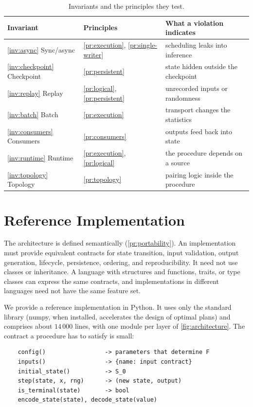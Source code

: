 \documentclass[11pt,a4paper]{article}
\theoremstyle{definition}
\theoremstyle{remark}
\begin{document}
\begin{table}[t]
\centering
\caption{Invariants and the principles they test.}
\label{tab:invariants}
\begin{tabular}{lll}
\toprule
\textbf{Invariant} & \textbf{Principles} & \textbf{What a violation indicates} \\
\midrule
\ref{inv:async} Sync/async & \ref{pr:execution}, \ref{pr:single-writer} & scheduling leaks into inference \\
\ref{inv:checkpoint} Checkpoint & \ref{pr:persistent} & state hidden outside the checkpoint \\
\ref{inv:replay} Replay & \ref{pr:logical}, \ref{pr:persistent} & unrecorded inputs or randomness \\
\ref{inv:batch} Batch & \ref{pr:execution} & transport changes the statistics \\
\ref{inv:consumers} Consumers & \ref{pr:consumers} & outputs feed back into state \\
\ref{inv:runtime} Runtime & \ref{pr:execution}, \ref{pr:logical} & the procedure depends on a source \\
\ref{inv:topology} Topology & \ref{pr:topology} & pairing logic inside the procedure \\
\bottomrule
\end{tabular}
\end{table}

\section{Reference Implementation}
\label{sec:implementation}

The architecture is defined semantically (\cref{pr:portability}). An
implementation must provide equivalent contracts for state transition,
input validation, output generation, lifecycle, persistence, ordering,
and reproducibility. It need not use classes or inheritance. A language
with structures and functions, traits, or type classes can express the
same contracts, and implementations in different languages need not
have the same feature set.

We provide a reference implementation in Python. It uses only the
standard library (numpy, when installed, accelerates the design of
optimal plans) and comprises about $14\,000$ lines, with one module per
layer of \cref{fig:architecture}. The contract a procedure has to
satisfy is small:

\begin{verbatim}
    config()                 -> parameters that determine F
    inputs()                 -> {name: input contract}
    initial_state()          -> S_0
    step(state, x, rng)      -> (new state, output)
    is_terminal(state)       -> bool
    encode_state(state), decode_state(value)
\end{verbatim}
\end{document}
